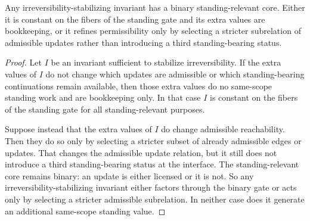 \begin{proposition}
\label{prop:binary-core-irreversibility-invariants}
Any irreversibility-stabilizing invariant has a binary standing-relevant core. Either it is constant on the fibers of the standing gate and its extra values are bookkeeping, or it refines permissibility only by selecting a stricter subrelation of admissible updates rather than introducing a third standing-bearing status.
\end{proposition}

\begin{proof}
Let $I$ be an invariant sufficient to stabilize irreversibility. If the extra values of $I$ do not change which updates are admissible or which standing-bearing continuations remain available, then those extra values do no same-scope standing work and are bookkeeping only. In that case $I$ is constant on the fibers of the standing gate for all standing-relevant purposes.

Suppose instead that the extra values of $I$ do change admissible reachability. Then they do so only by selecting a stricter subset of already admissible edges or updates. That changes the admissible update relation, but it still does not introduce a third standing-bearing status at the interface. The standing-relevant core remains binary: an update is either licensed or it is not. So any irreversibility-stabilizing invariant either factors through the binary gate or acts only by selecting a stricter admissible subrelation. In neither case does it generate an additional same-scope standing value.\cite{MaleyAMetric}
\end{proof}


